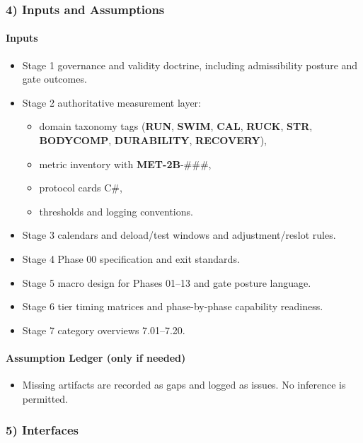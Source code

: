 \documentclass[10pt]{article}
\begin{document}
\subsubsection*{4) Inputs and Assumptions}

\paragraph*{Inputs}

\begin{itemize}
\item Stage 1 governance and validity doctrine, including admissibility posture and gate outcomes.
\item Stage 2 authoritative measurement layer:
  \begin{itemize}
  \item domain taxonomy tags (\textbf{RUN}, \textbf{SWIM}, \textbf{CAL}, \textbf{RUCK}, \textbf{STR}, \textbf{BODYCOMP}, \textbf{DURABILITY}, \textbf{RECOVERY}),
  \item metric inventory with \textbf{MET-2B}-\#\#\#,
  \item protocol cards C\#,
  \item thresholds and logging conventions.
  \end{itemize}
\item Stage 3 calendars and deload/test windows and adjustment/reslot rules.
\item Stage 4 Phase 00 specification and exit standards.
\item Stage 5 macro design for Phases 01–13 and gate posture language.
\item Stage 6 tier timing matrices and phase-by-phase capability readiness.
\item Stage 7 category overviews 7.01–7.20.
\end{itemize}

\paragraph*{Assumption Ledger (only if needed)}

\begin{itemize}
\item Missing artifacts are recorded as gaps and logged as issues. No inference is permitted.
\end{itemize}

\subsubsection*{5) Interfaces}
\end{document}
